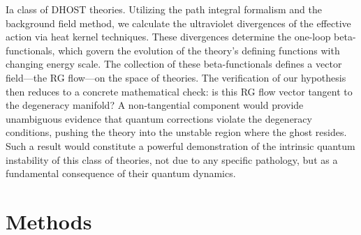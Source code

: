 \documentclass[twocolumn]{aastex631}
\begin{document}
Ia class of DHOST theories. Utilizing the path integral formalism and the background field method, we calculate the ultraviolet divergences of the effective action via heat kernel techniques. These divergences determine the one-loop beta-functionals, which govern the evolution of the theory's defining functions with changing energy scale. The collection of these beta-functionals defines a vector field---the RG flow---on the space of theories. The verification of our hypothesis then reduces to a concrete mathematical check: is this RG flow vector tangent to the degeneracy manifold? A non-tangential component would provide unambiguous evidence that quantum corrections violate the degeneracy conditions, pushing the theory into the unstable region where the ghost resides. Such a result would constitute a powerful demonstration of the intrinsic quantum instability of this class of theories, not due to any specific pathology, but as a fundamental consequence of their quantum dynamics.

\section{Methods}
\label{sec:methods}
\end{document}

